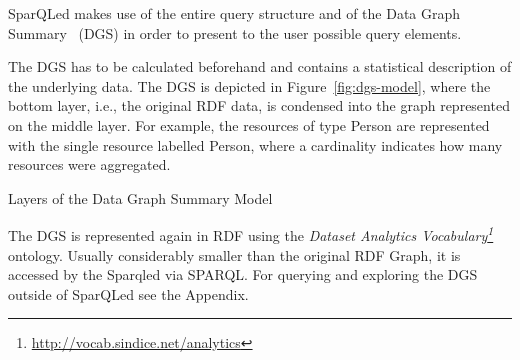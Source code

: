 
SparQLed makes use of the entire query structure and of the Data Graph Summary~\cite{campinas:dexa:2012} (DGS) in order to present to the user possible query elements.

The DGS has to be calculated beforehand and contains a statistical description of the underlying data. The DGS is depicted in Figure~\ref{fig:dgs-model}, where the bottom layer, i.e., the original RDF data, is condensed into the graph represented on the middle layer. For example, the resources of type Person are represented with the single resource labelled Person, where a cardinality indicates how many resources were aggregated.

\begin{marginfigure}
\centering
    \caption{Layers of the Data Graph Summary Model}
    \label{fig:dgs-model}
\end{marginfigure}

The DGS is represented again in RDF using the \emph{Dataset Analytics Vocabulary\footnote{\url{http://vocab.sindice.net/analytics}}} ontology. Usually considerably smaller than the original RDF Graph, it is accessed by the Sparqled via SPARQL. For querying and exploring the DGS outside of SparQLed see the Appendix.

